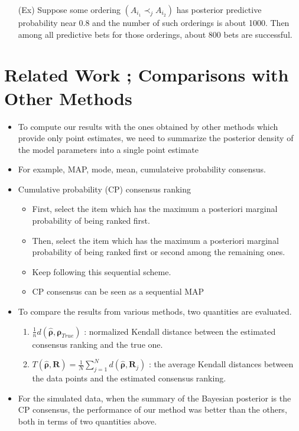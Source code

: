 \documentclass[12pt]{article}
\begin{document}
\begin{itemize}
\begin{itemize}
\begin{enumerate}
            \item[(Ex)] Suppose some ordering $(A_{i_1}\prec_j A_{i_2})$ has posterior predictive probability near 0.8 and the number of such orderings is about 1000. Then among all predictive bets for those orderings, about 800 bets are successful. 
        \end{enumerate}
    \end{itemize}
\end{itemize}
\section{Related Work ; Comparisons with Other Methods}
\begin{itemize}
    \item To compute our results with the ones obtained by other methods which provide only point estimates, we need to summarize the posterior density of the model parameters into a single point estimate
    \item For example, MAP, mode, mean, cumulateive probability consensus.
    \item Cumulative probability (CP) consensus ranking
    \begin{itemize}
        \item First, select the item which has the maximum a posteriori marginal probability of being ranked first.
        \item Then, select the item which has the maximum a posteriori marginal probability of being ranked first or second among the remaining ones.
        \item Keep following this sequential scheme.
        \item CP consensus can be seen as a sequential MAP
    \end{itemize}
    \item To compare the results from various methods, two quantities are evaluated.
    \begin{enumerate}
        \item $\frac{1}{n}d(\hat{\boldsymbol{\rho}}, \boldsymbol{\rho}_{True})$ : normalized Kendall distance between the estimated consensus ranking and the true one.
        \item $T(\hat{\boldsymbol{\rho}}, \mathbf{R})=\frac{1}{N}\sum_{j=1}^N d(\hat{\boldsymbol{\rho}}, \mathbf{R}_j)$ : the average Kendall distances between the data points and the estimated consensus ranking. 
    \end{enumerate}
    \item For the simulated data, when the summary of the Bayesian posterior is the CP consensus, the performance of our method was better than the others, both in terms of two quantities above. 
\end{itemize}
\end{document}
